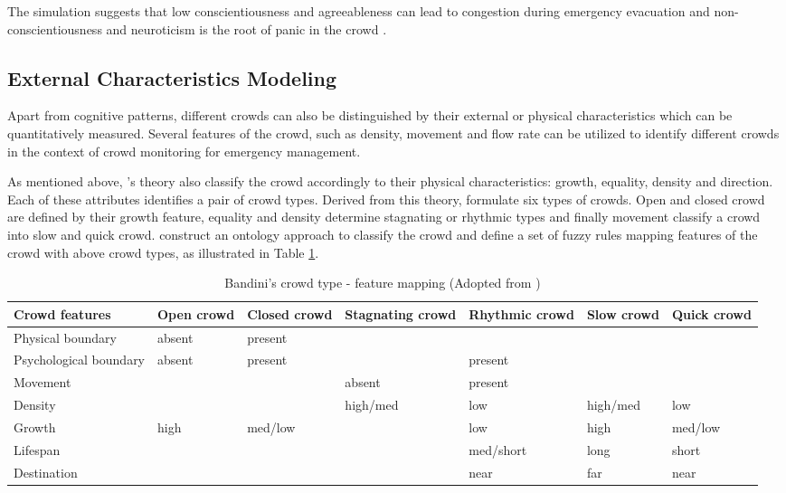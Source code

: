The simulation suggests that low conscientiousness and agreeableness can lead to congestion during emergency evacuation and non-conscientiousness and neuroticism is the root of panic in the crowd \citep{Durupinar2008}.

\subsection{External Characteristics Modeling}

Apart from cognitive patterns, different crowds can also be distinguished by their external or physical characteristics which can be quantitatively measured. Several features of the crowd, such as density, movement and flow rate can be utilized to identify different crowds in the context of crowd monitoring for emergency management.

As mentioned above, \citet{Canetti1962}’s theory also classify the crowd accordingly to their physical characteristics: growth, equality, density and direction. Each of these attributes identifies a pair of crowd types. Derived from this theory, \citet{Bandini2011} formulate six types of crowds. Open and closed crowd are defined by their growth feature, equality and density determine stagnating or rhythmic types and finally movement classify a crowd into slow and quick crowd. \citet{Bandini2011} construct an ontology approach to classify the crowd and define a set of fuzzy rules mapping features of the crowd with above crowd types, as illustrated in Table \ref{table:bandiniCrowdType}.

\begin{table}
	\caption{Bandini's crowd type - feature mapping (Adopted from \citet{Bandini2011})}
	\label{table:bandiniCrowdType}
	\centering
	\begin{tabular}{|p{2.5cm}|p{1.5cm}|p{1.5cm}|p{2cm}|p{2cm}|p{1.5cm}|p{1.5cm}|}
		\hline
		\textbf{Crowd features} & \textbf{Open crowd} & \textbf{Closed crowd} & \textbf{Stagnating crowd} & \textbf{Rhythmic crowd} & \textbf{Slow crowd} & \textbf{Quick crowd} \\ \hline \hline
		Physical boundary & absent & present & & & & \\ \hline
		Psychological boundary & absent & present & & present & & \\ \hline
		Movement & & & absent & present & & \\ \hline
		Density & & & high/med & low & high/med & low \\ \hline
		Growth & high & med/low & & low & high & med/low \\ \hline
		Lifespan & & & & med/short & long & short \\ \hline
		Destination & & & & near & far & near \\ \hline
	\end{tabular}
\end{table}

